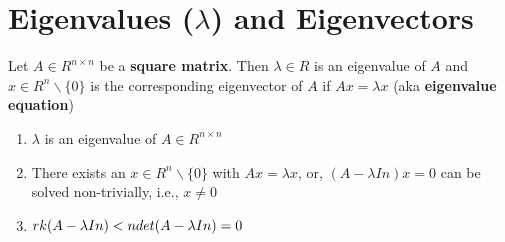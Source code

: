\section{Eigenvalues ($\lambda$) and Eigenvectors} \label{Eigenvalues and Eigenvectors}

Let $A \in  R^{n\times n}$ be a \textbf{square matrix}. Then $\lambda  \in  R$ is an eigenvalue of $A$ and $x \in  R^n\backslash \{0\}$ is the corresponding eigenvector of $A$ if $Ax = \lambda x$ (aka \textbf{eigenvalue equation})

\begin{enumerate}
    \item $\lambda$  is an eigenvalue of $A \in  R^{n\times n}$

    \item There exists an $x \in  R^n\backslash \{0\}$ with $Ax = \lambda x$, or, $(A - \lambda In)x = 0$ can be solved non-trivially, i.e., $x \neq 0$

    \item \(
        \hfill
        rk(A - \lambda In) < n
        \hfill
        det(A - \lambda In) = 0
        \hfill
    \)
\end{enumerate}

